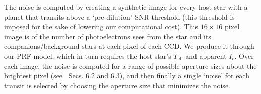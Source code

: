 \begin{itemize}
	The noise is computed by creating a synthetic image for every host star with a planet that transits above a `pre-dilution' SNR threshold (this threshold is imposed for the sake of lowering our computational cost).
	This $16\times16$ pixel image is of the number of photoelectrons \tess sees from the star and its companions/background stars at each pixel of each CCD. 
	We produce it through our PRF model, which in turn requires the host star's $T_\mathrm{eff}$ and apparent $I_c$.
	Over each image, the noise is computed for a range of possible aperture sizes about the brightest pixel (see~ Secs. 6.2 and 6.3), and then finally a single `noise' for each transit is selected by choosing the aperture size that minimizes the noise.
\end{itemize}